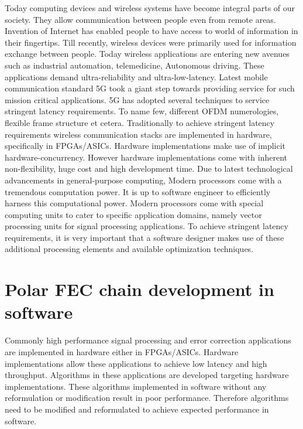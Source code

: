Today computing devices and wireless systems have become integral parts of our society. They allow communication between people even from remote areas. Invention of Internet has enabled people to have access to world of information in their fingertips. Till recently, wireless devices were primarily used for information exchange between people. Today wireless applications are entering new avenues such as industrial automation, telemedicine, Autonomous driving. These applications demand ultra-reliability and ultra-low-latency. Latest mobile communication standard 5G took a giant step towards providing service for such mission critical applications. 5G has adopted several techniques to service stringent latency requirements. To name few, different OFDM numerologies, flexible frame structure et cetera. Traditionally to achieve stringent latency requirements wireless communication stacks are implemented in hardware, specifically in FPGAs/ASICs. Hardware implementations make use of implicit hardware-concurrency. However hardware implementations come with inherent non-flexibility, huge cost and high development time. Due to latest technological advancements in general-purpose computing, Modern processors come with a tremendous computation power. It is up to software engineer to efficiently harness this computational power. Modern processors come with special computing units to cater to specific application domains, namely vector processing units for signal processing applications. To achieve stringent latency requirements, it is very important that a software designer makes use of these additional processing elements and available optimization techniques.

%
%

\section{Polar FEC chain development in software}
Commonly high performance signal processing and error correction applications are implemented in hardware either in FPGAs/ASICs. Hardware implementations allow these applications to achieve low latency and high throughput. Algorithms in these applications are developed targeting hardware implementations. These algorithms implemented in software without any reformulation or modification result in poor performance. Therefore algorithms need to be modified and reformulated to achieve expected performance in software. \newline


